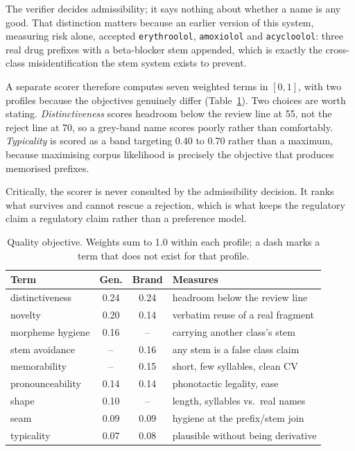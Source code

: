 \documentclass[conference]{IEEEtran}
\newcommand{\code}[1]{\texttt{\footnotesize #1}}
\begin{document}
The verifier decides admissibility; it says nothing about whether a name is any
good. That distinction matters because an earlier version of this system,
measuring risk alone, accepted \code{erythroolol}, \code{amoxiolol} and
\code{acycloolol}: three real drug prefixes with a beta-blocker stem appended,
which is exactly the cross-class misidentification the stem system exists to
prevent.

A separate scorer therefore computes seven weighted terms in $[0,1]$, with two
profiles because the objectives genuinely differ (Table~\ref{tab:weights}). Two
choices are worth stating. \emph{Distinctiveness} scores headroom below the
review line at 55, not the reject line at 70, so a grey-band name scores poorly
rather than comfortably. \emph{Typicality} is scored as a band targeting 0.40 to
0.70 rather than a maximum, because maximising corpus likelihood is precisely
the objective that produces memorised prefixes.

Critically, the scorer is never consulted by the admissibility decision. It ranks
what survives and cannot rescue a rejection, which is what keeps the regulatory
claim a regulatory claim rather than a preference model.

\begin{table}[t]
\caption{Quality objective. Weights sum to 1.0 within each profile;
a dash marks a term that does not exist for that profile.}
\label{tab:weights}
\centering
\footnotesize
\setlength{\tabcolsep}{3.5pt}
\begin{tabular}{lccl}
\toprule
Term & Gen. & Brand & Measures \\
\midrule
distinctiveness  & 0.24 & 0.24 & headroom below the review line \\
novelty          & 0.20 & 0.14 & verbatim reuse of a real fragment \\
morpheme hygiene & 0.16 & --   & carrying another class's stem \\
stem avoidance   & --   & 0.16 & any stem is a false class claim \\
memorability     & --   & 0.15 & short, few syllables, clean CV \\
pronounceability & 0.14 & 0.14 & phonotactic legality, ease \\
shape            & 0.10 & --   & length, syllables vs.\ real names \\
seam             & 0.09 & 0.09 & hygiene at the prefix/stem join \\
typicality       & 0.07 & 0.08 & plausible without being derivative \\
\bottomrule
\end{tabular}
\end{table}
\end{document}

